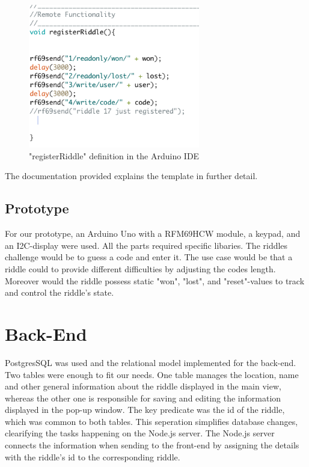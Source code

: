 


\begin{figure}[th]
	\centering
	\includegraphics[width=75mm,scale=0.75]{Figures/registerRiddle}
	\decoRule
	\caption[registerRiddle]{"registerRiddle" definition in the Arduino IDE}
	\label{fig:registerRiddle}
\end{figure}


The documentation provided explains the template in further detail.

\subsection{Prototype}

For our prototype, an Arduino Uno with a RFM69HCW module, a keypad, and an I2C-display were used.
All the parts required specific libaries.
The riddles challenge would be to guess a code and enter it.
The use case would be that a riddle could to provide different difficulties by adjusting the codes length.
Moreover would the riddle possess static  "won", "lost", and "reset"-values to track and control the riddle's state.

\section{Back-End}
PostgresSQL was used and the relational model implemented for the back-end.
Two tables were enough to fit our needs.
One table manages the location, name and other general information about the riddle displayed in the main view,
whereas the other one is responsible for saving and editing the information displayed in the pop-up window.
The key predicate was the id of the riddle, which was common to both tables.
This seperation simplifies database changes, clearifying the tasks happening on the Node.js server.
The Node.js server connects the information when sending to the front-end by assigning the details with the riddle's id to the corresponding riddle.


